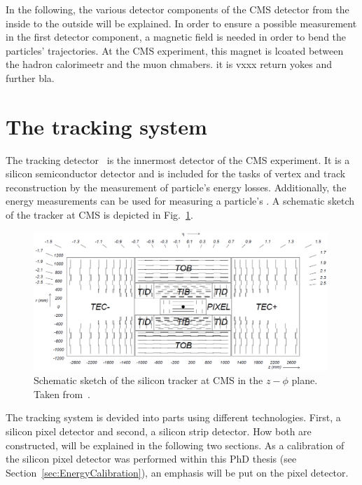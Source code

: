 In the following, the various detector components of the CMS detector from the inside to the outside will be explained.
In order to ensure a possible measurement in the first detector component, a magnetic field is needed in order to bend the particles' trajectories.
At the CMS experiment, this magnet is lcoated between the hadron calorimeetr and the muon chmabers.
it is vxxx return yokes and further bla.


\FloatBarrier
\section{The tracking system}

The tracking detector~\cite{bib:CMS:Tracker_1997,bib:CMS:Tracker_2000} is the innermost detector of the CMS experiment. 
It is a silicon semiconductor detector and is included for the tasks of vertex and track reconstruction by the measurement of particle's energy losses.
Additionally, the energy measurements can be used for measuring a particle's \dedx.
A schematic sketch of the tracker at CMS is depicted in Fig.~\ref{fig:Tracker}.
\begin{figure}[!b]
  \centering
      \includegraphics[width=0.99\textwidth]{figures/experiment/CMS/Figures_Experimental_Apparatus_Tracker.png}
  \caption{Schematic sketch of the silicon tracker at CMS in the $z - \phi$ plane. Taken from~\cite{bib:CMS:tracking_8TeV}.}  
  \label{fig:Tracker}
\end{figure}
The tracking system is devided into parts using different technologies. First, a silicon pixel detector and second, a silicon strip detector.
How both are constructed, will be explained in the following two sections.
As a calibration of the silicon pixel detector was performed within this PhD thesis (see Section~\ref{sec:EnergyCalibration}), an emphasis will be put on the pixel detector.

